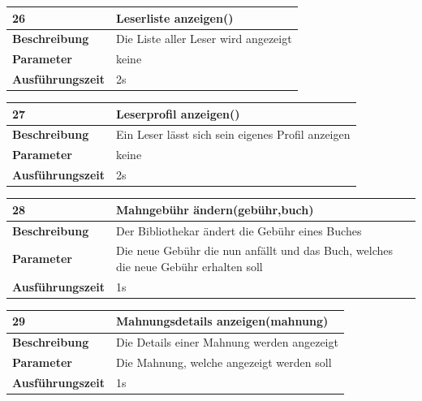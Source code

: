 \documentclass[fontsize=12pt,paper=a4,twoside]{scrartcl}
\begin{document}
  \begin{table}[htbp]
  \label{a26}
  \begin{tabular}{|l|p{10cm}|}
  \hline 
  \textbf{26} & \textbf{Leserliste anzeigen()} \\ \hline
  \textbf{Beschreibung} & Die Liste aller Leser wird angezeigt\\ \hline
  \textbf{Parameter} & keine \\ \hline
  \textbf{Ausführungszeit} & 2s\\ \hline
  \end{tabular}
  \end{table}


  \begin{table}[htbp]
  \label{a27}
  \begin{tabular}{|l|p{10cm}|}
  \hline 
  \textbf{27} & \textbf{Leserprofil anzeigen()} \\ \hline
  \textbf{Beschreibung} & Ein Leser lässt sich sein eigenes Profil anzeigen\\ \hline
  \textbf{Parameter} & keine \\ \hline
  \textbf{Ausführungszeit} & 2s\\ \hline
  \end{tabular}
  \end{table}

  \begin{table}[htbp]
  \label{a28}
  \begin{tabular}{|l|p{10cm}|}
  \hline 
  \textbf{28} & \textbf{Mahngebühr ändern(gebühr,buch)} \\ \hline
  \textbf{Beschreibung} & Der Bibliothekar ändert die Gebühr eines Buches\\ \hline
  \textbf{Parameter} & Die neue Gebühr die nun anfällt und das Buch, welches die neue Gebühr erhalten soll \\ \hline
  \textbf{Ausführungszeit} & 1s\\ \hline
  \end{tabular}
  \end{table}
  
  
  \begin{table}[htbp]
  \label{a29}
  \begin{tabular}{|l|p{10cm}|}
  \hline 
  \textbf{29} & \textbf{Mahnungsdetails anzeigen(mahnung)} \\ \hline
  \textbf{Beschreibung} & Die Details einer Mahnung werden angezeigt\\ \hline
  \textbf{Parameter} & Die Mahnung, welche angezeigt werden soll \\ \hline
  \textbf{Ausführungszeit} & 1s\\ \hline
  \end{tabular}
  \end{table}
\end{document}
